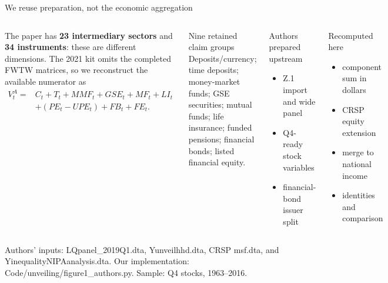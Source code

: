 \documentclass[aspectratio=169,11pt]{beamer}
\newcommand{\source}[1]{%
  \vfill
  {\color{MSSGray}\fontsize{6.5}{7.5}\selectfont #1\par}
}
\begin{document}
\begin{frame}{We reuse preparation, not the economic aggregation}
  \fontsize{8.6}{10.2}\selectfont
  \begin{columns}[T,onlytextwidth]
    The paper has \textbf{23 intermediary sectors} and \textbf{34 instruments}:
    these are different dimensions.  The 2021 kit omits the completed FWTW
    matrices, so we reconstruct the available numerator as
    \begin{align*}
      V_t^A={}&C_t+T_t+MMF_t+GSE_t+MF_t+LI_t\\
              &+(PE_t-UPE_t)+FB_t+FE_t.
    \end{align*}
    \begin{block}{Nine retained claim groups}
      Deposits/currency; time deposits; money-market funds; GSE securities;
      mutual funds; life insurance; funded pensions; financial bonds; listed
      financial equity.
    \end{block}

    \begin{block}{Authors prepared upstream}
      \begin{itemize}
        \item Z.1 import and wide panel
        \item Q4-ready stock variables
        \item financial-bond issuer split
      \end{itemize}
    \end{block}
    \begin{block}{Recomputed here}
      \begin{itemize}
        \item component sum in dollars
        \item CRSP equity extension
        \item merge to national income
        \item identities and comparison
      \end{itemize}
    \end{block}
  \end{columns}
  \source{Authors' inputs: LQpanel\_2019Q1.dta, Yunveilhhd.dta, CRSP msf.dta, and YinequalityNIPAanalysis.dta. Our implementation: Code/unveiling/figure1\_authors.py. Sample: Q4 stocks, 1963--2016.}
\end{frame}
\end{document}
